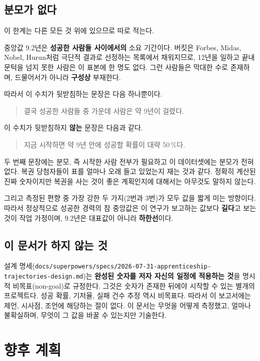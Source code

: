 \documentclass[11pt]{article}
\begin{document}
\subsection{분모가 없다}

이 한계는 다른 모든 것 위에 있으므로 따로 적는다.

중앙값 9.2년은 \textbf{성공한 사람들 사이에서의} 소요 기간이다.
버킷은 Forbes, Midas, Nobel, Hurun처럼 극단적 결과로 선정하는 목록에서 채워지므로,
12년을 일하고 끝내 문턱을 넘지 못한 사람은 이 표본에 한 명도 없다.
그런 사람들은 막대한 수로 존재하며, 드물어서가 아니라 \textbf{구성상} 부재한다.

따라서 이 수치가 뒷받침하는 문장은 다음 하나뿐이다.

\begin{quote}
결국 성공한 사람들 중 가운데 사람은 약 9년이 걸렸다.
\end{quote}

이 수치가 뒷받침하지 \textbf{않는} 문장은 다음과 같다.

\begin{quote}
지금 시작하면 약 9년 안에 성공할 확률이 대략 50\,\%다.
\end{quote}

두 번째 문장에는 분모, 즉 시작한 사람 전부가 필요하고 이 데이터셋에는 분모가 전혀 없다.
복권 당첨자들이 표를 얼마나 오래 들고 있었는지 재는 것과 같다.
정확히 계산된 진짜 숫자이지만 복권을 사는 것이 좋은 계획인지에 대해서는 아무것도 말하지 않는다.

그리고 측정된 편향 중 가장 강한 두 가지(2번과 3번)가 모두 값을 짧게 미는 방향이다.
따라서 정상적으로 성공한 경력의 참 중앙값은
이 연구가 보고하는 값보다 \textbf{길다}고 보는 것이 작업 가정이며,
9.2년은 대표값이 아니라 \textbf{하한선}이다.

\subsection{이 문서가 하지 않는 것}

설계 명세(\texttt{docs/superpowers/specs/2026-07-31-apprenticeship-trajectories-design.md})는
\textbf{완성된 숫자를 저자 자신의 일정에 적용하는 것}을 명시적 비목표(non-goal)로 규정한다.
그것은 숫자가 존재한 뒤에야 시작할 수 있는 별개의 프로젝트다.
성공 확률, 기저율, 실패 건수 추정 역시 비목표다.
따라서 이 보고서에는 제언, 시사점, 조언에 해당하는 절이 없다.
이 문서는 무엇을 어떻게 측정했고, 얼마나 불확실하며, 무엇이 그 값을 바꿀 수 있는지만 기술한다.

\section{향후 계획}
\end{document}
